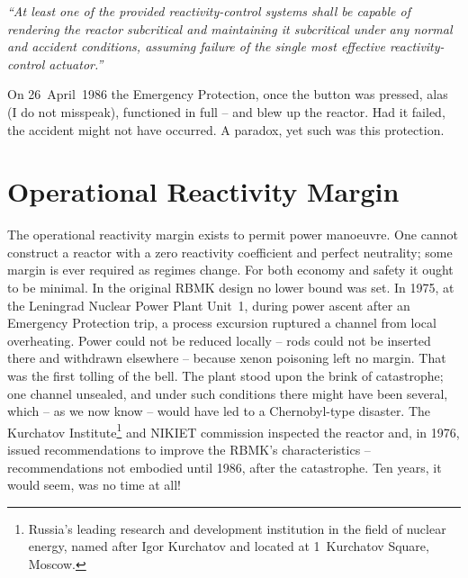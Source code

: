 \documentclass[openright]{bookest}
\begin{document}
\begin{personal}
\textit{``At least one of the provided reactivity-control systems shall be capable of rendering the reactor subcritical and maintaining it subcritical under any normal and accident conditions, assuming failure of the single most effective reactivity-control actuator.''}
\end{personal}

On 26~April~1986 the Emergency Protection, once the button was pressed, alas (I do not misspeak), functioned in full -- and blew up the reactor. Had it failed, the accident might not have occurred. A paradox, yet such was this protection.

\section{Operational Reactivity Margin}

The operational reactivity margin exists to permit power manoeuvre. One cannot construct a reactor with a zero reactivity coefficient and perfect neutrality; some margin is ever required as regimes change. For both economy and safety it ought to be minimal. In the original RBMK design no lower bound was set. In 1975, at the Leningrad Nuclear Power Plant Unit~1, during power ascent after an Emergency Protection trip, a process excursion ruptured a channel from local overheating. Power could not be reduced locally -- rods could not be inserted there and withdrawn elsewhere -- because xenon poisoning left no margin. That was the first tolling of the bell. The plant stood upon the brink of catastrophe; one channel unsealed, and under such conditions there might have been several, which -- as we now know -- would have led to a Chernobyl-type disaster. The Kurchatov Institute\footnote{Russia's leading research and development institution in the field of nuclear energy, named after Igor Kurchatov and located at 1~Kurchatov Square, Moscow.} and NIKIET commission inspected the reactor and, in 1976, issued recommendations to improve the RBMK's characteristics -- recommendations not embodied until 1986, after the catastrophe. Ten years, it would seem, was no time at all!
\end{document}
